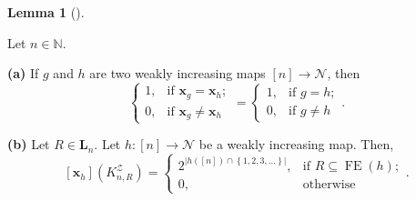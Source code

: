 \documentclass[numbers=enddot,12pt,final,onecolumn,notitlepage]{scrartcl}%
\theoremstyle{definition}
\newtheorem{lem}[theo]{Lemma}
\newenvironment{lemma}[1][]
{\begin{lem}[#1]\begin{leftbar}}
{\end{leftbar}\end{lem}}
\begin{document}
\begin{lemma}
\label{lem.KnL.coeff}Let $n\in\mathbb{N}$.

\textbf{(a)} If $g$ and $h$ are two weakly increasing maps $\left[  n\right]
\rightarrow\mathcal{N}$, then
\[%
\begin{cases}
1, & \text{if }\mathbf{x}_{g}=\mathbf{x}_{h};\\
0, & \text{if }\mathbf{x}_{g}\neq\mathbf{x}_{h}%
\end{cases}
=%
\begin{cases}
1, & \text{if }g=h;\\
0, & \text{if }g\neq h
\end{cases}
.
\]


\textbf{(b)} Let $R\in\mathbf{L}_{n}$. Let $h:\left[  n\right]  \rightarrow
\mathcal{N}$ be a weakly increasing map. Then,%
\[
\left[  \mathbf{x}_{h}\right]  \left(  K_{n,R}^{\mathcal{Z}}\right)  =%
\begin{cases}
2^{\left\vert h\left(  \left[  n\right]  \right)  \cap\left\{  1,2,3,\ldots
\right\}  \right\vert }, & \text{if }R\subseteq\operatorname*{FE}\left(
h\right)  ;\\
0, & \text{otherwise}%
\end{cases}
.
\]

\end{lemma}
\end{document}
